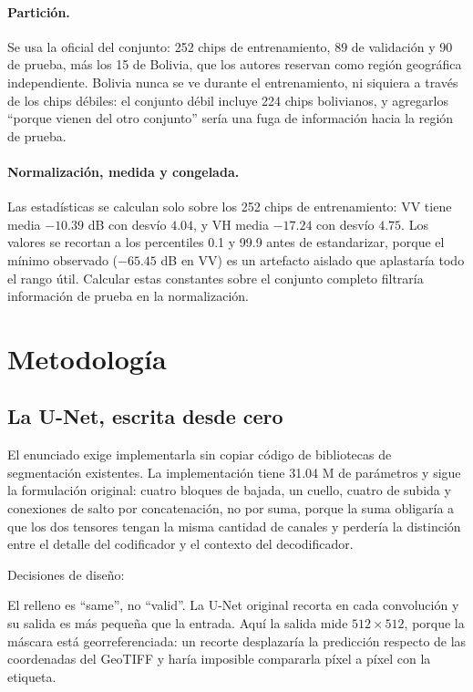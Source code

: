 \documentclass{article}
\begin{document}
\paragraph{Partición.} Se usa la oficial del conjunto: 252 chips de
entrenamiento, 89 de validación y 90 de prueba, más los 15 de Bolivia,
que los autores reservan como región geográfica independiente. Bolivia nunca se
ve durante el entrenamiento, ni siquiera a través de los chips débiles: el
conjunto débil incluye 224 chips bolivianos, y agregarlos ``porque vienen del
otro conjunto'' sería una fuga de información hacia la región de prueba.

\paragraph{Normalización, medida y congelada.} Las estadísticas se calculan
solo sobre los 252 chips de entrenamiento: VV tiene media $-10.39$ dB
con desvío $4.04$, y VH media $-17.24$ con desvío $4.75$. Los valores se recortan
a los percentiles 0.1 y 99.9 antes de estandarizar, porque el mínimo observado
($-65.45$ dB en VV) es un artefacto aislado que aplastaría todo el rango útil.
Calcular estas constantes sobre el conjunto completo filtraría información de
prueba en la normalización.

\section{Metodología}

\subsection{La U-Net, escrita desde cero}

El enunciado exige implementarla sin copiar código de bibliotecas de
segmentación existentes. La implementación tiene 31.04 M de parámetros y sigue
la formulación original: cuatro bloques de bajada, un cuello, cuatro de subida y
conexiones de salto por concatenación, no por suma, porque la suma obligaría
a que los dos tensores tengan la misma cantidad de canales y perdería la
distinción entre el detalle del codificador y el contexto del decodificador.

Decisiones de diseño:

El relleno es ``same'', no ``valid''. La U-Net original recorta en cada
convolución y su salida es más pequeña que la entrada. Aquí la salida mide
$512\times512$, porque la máscara está georreferenciada: un recorte
desplazaría la predicción respecto de las coordenadas del GeoTIFF y haría
imposible compararla píxel a píxel con la etiqueta.
\end{document}
